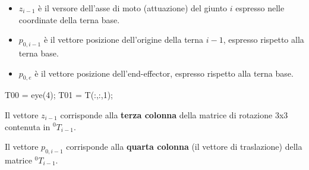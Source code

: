 \documentclass[11pt, a4paper]{article}
\begin{document}
\begin{itemize}
   \item{\begin{flushleft} $z_{i-1}$ è il versore dell'asse di moto (attuazione) del giunto $i$ espresso nelle coordinate della terna base. \end{flushleft}}
   \item{\begin{flushleft} $p_{0,i-1}$ è il vettore posizione dell'origine della terna $i-1$, espresso rispetto alla terna base. \end{flushleft}}
   \item{\begin{flushleft} $p_{0,e}$ è il vettore posizione dell'end-effector, espresso rispetto alla terna base. \end{flushleft}}
\end{itemize}
\vspace{5mm}
\begin{matlabcode}
T00 = eye(4);
T01 = T(:,:,1);
\end{matlabcode}

\begin{par}
\begin{flushleft}
Il vettore $z_{i-1}$ corrisponde alla \textbf{terza colonna} della matrice di rotazione 3x3 contenuta in $^0 T_{i-1}$.
\end{flushleft}
\end{par}

\begin{par}
\begin{flushleft}
Il vettore $p_{0,i-1}$ corrisponde alla \textbf{quarta colonna} (il vettore di traslazione) della matrice $^0 T_{i-1}$.
\end{flushleft}
\end{par}
\end{document}
